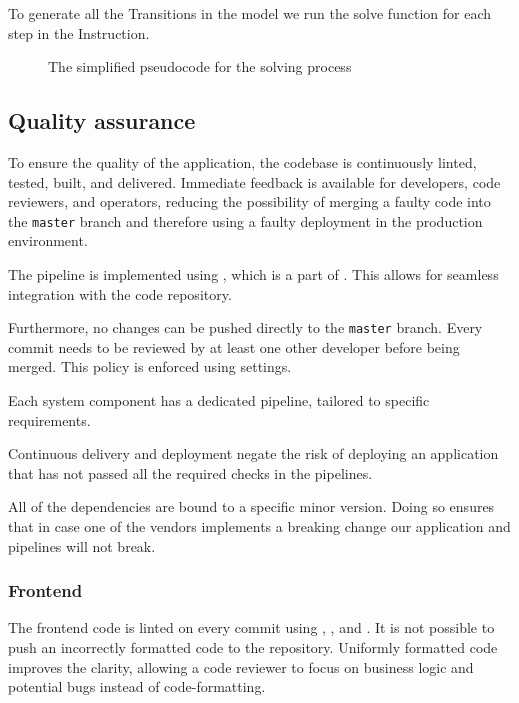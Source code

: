 To generate all the Transitions in the model we run the solve function for each step in the Instruction.

\begin{figure}[H]
	\caption{The simplified pseudocode for the solving process}
	
\end{figure}


\subsection{Quality assurance}

To ensure the quality of the application, the codebase is continuously linted, tested, built, and delivered. Immediate feedback is available for developers, code reviewers, and operators, reducing the possibility of merging a faulty code into the \texttt{master} branch and therefore using a faulty deployment in the production environment.

\medskip
The pipeline is implemented using , which is a part of . This allows for seamless integration with the code repository.

\medskip
Furthermore, no changes can be pushed directly to the \texttt{master} branch. Every commit needs to be reviewed by at least one other developer before being merged. This policy is enforced using  settings.

\medskip
Each system component has a dedicated pipeline, tailored to specific requirements. 

\medskip
Continuous delivery and deployment negate the risk of deploying an application that has not passed all the required checks in the pipelines.

\medskip
All of the dependencies are bound to a specific minor version. Doing so ensures that in case one of the vendors implements a breaking change our application and pipelines will not break.

\subsubsection{Frontend}

The frontend code is linted on every commit using , , and . It is not possible to push an incorrectly formatted code to the repository.
Uniformly formatted code improves the clarity, allowing a code reviewer to focus on business logic and potential bugs instead of code-formatting.

